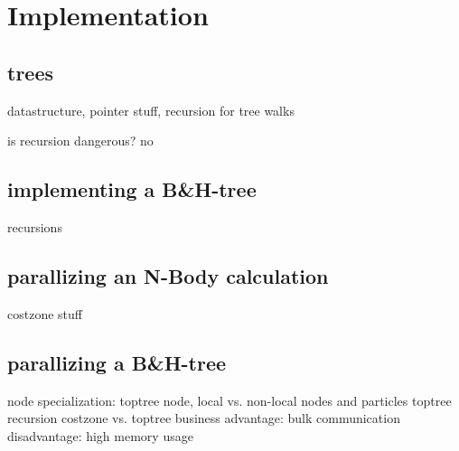 
\section{Implementation}

\subsection{trees}

datastructure, pointer stuff, recursion for tree walks

is recursion dangerous? no

\subsection{implementing a B\&H-tree}

recursions

\subsection{parallizing an N-Body calculation}

costzone stuff

\subsection{parallizing a B\&H-tree}

node specialization: toptree node, local vs. non-local nodes and particles
toptree recursion
costzone vs. toptree business
advantage: bulk communication
disadvantage: high memory usage